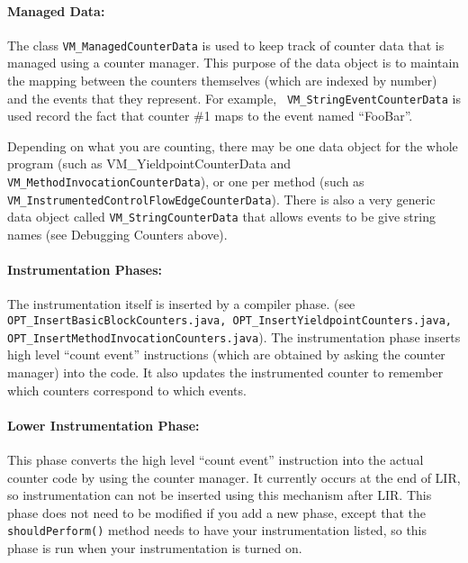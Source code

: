 \paragraph{Managed Data:} The class {\tt VM\_ManagedCounterData} is used to
keep track of counter data that is managed using a counter
manager. This purpose of the data object is to maintain the mapping
between the counters themselves (which are indexed by number) and the
events that they represent.  For example, {\tt
VM\_StringEventCounterData} is used record the fact that counter \#1
maps to the event named ``FooBar''.  


Depending on what you are counting, there may be one data object for
the whole program (such as VM\_YieldpointCounterData and
{\tt VM\_MethodInvocationCounterData}), or one per method (such as
{\tt VM\_InstrumentedControlFlowEdgeCounterData}).  There is also a
very generic data object called {\tt VM\_StringCounterData} that
allows events to be give string names (see Debugging Counters above).

\paragraph{Instrumentation Phases:}  The instrumentation itself is
inserted by a compiler phase.  (see
{\tt OPT\_InsertBasicBlockCounters.java,
OPT\_InsertYieldpointCounters.java,
OPT\_InsertMethodInvocationCounters.java}).  The instrumentation phase
inserts high level ``count event'' instructions (which are obtained by
asking the counter manager) into the code.  It also updates the
instrumented counter to remember which counters correspond to which
events.

\paragraph{Lower Instrumentation Phase:}  This phase 
converts the high level ``count event'' instruction into the actual
counter code by using the counter manager.  It currently occurs at the
end of LIR, so instrumentation can not be inserted using this
mechanism after LIR.  This phase does not need to be modified if you
add a new phase, except that the {\tt shouldPerform()} method needs to
have your instrumentation listed, so this phase is run when your
instrumentation is turned on.


